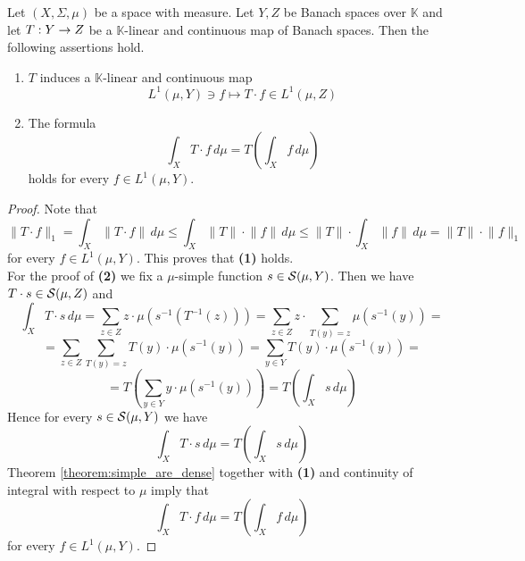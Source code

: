 \begin{proposition}\label{proposition:Bochner_integral_commutes_with_any_continuous_linear_operation}
    Let $(X,\Sigma,\mu)$ be a space with measure. Let $Y, Z$ be Banach spaces over $\mathbb{K}$ and let $T:Y \rightarrow Z$ be a $\mathbb{K}$-linear and continuous map of Banach spaces. Then the following assertions hold.
    \begin{enumerate}[label=\emph{\textbf{(\arabic*)}}, leftmargin=*]
        \item $T$ induces a $\mathbb{K}$-linear and continuous map 
        $$L^1(\mu,Y) \ni f \mapsto T \cdot f \in L^1(\mu,Z)$$
        \item The formula 
        $$\int_X T\cdot f \,d\mu = T\left(\int_X f\,d\mu\right)$$
        holds for every $f \in L^1(\mu,Y)$.
    \end{enumerate}
\end{proposition}
\begin{proof}
    Note that
    $$\lVert T\cdot f \rVert_1 = \int_X\lVert T\cdot f \rVert\,d\mu \leq \int_X \lVert T\rVert\cdot \lVert f \rVert\,d\mu \leq \lVert T\rVert\cdot \int_X  \lVert f \rVert\,d\mu = \lVert T\rVert\cdot \lVert f \rVert_1$$
    for every $f \in L^1(\mu,Y)$. This proves that \textbf{(1)} holds.\\
    For the proof of \textbf{(2)} we fix a $\mu$-simple function $s \in {\mathcal S}(\mu,Y)$. Then we have $T\cdot s \in {\mathcal S}(\mu,Z)$ and
    $$\int_X T\cdot s\,d\mu = \sum_{z \in Z}z \cdot \mu\left(s^{-1}\left(T^{-1}(z)\right)\right) = \sum_{z\in Z}z\cdot \sum_{T(y) = z}\mu\left(s^{-1}(y)\right) = $$
    $$= \sum_{z \in Z}\sum_{T(y) = z}T(y)\cdot \mu\left(s^{-1}(y)\right) = \sum_{y\in Y} T(y)\cdot \mu\left(s^{-1}(y)\right) = $$
    $$=T\left( \sum_{y\in Y} y\cdot \mu\left(s^{-1}(y)\right) \right) = T\left( \int_X s\,d\mu\right)$$
    Hence for every $s \in {\mathcal S}(\mu,Y)$ we have 
    $$\int_X T\cdot s \,d\mu = T\left(\int_X s\,d\mu\right)$$
    Theorem \ref{theorem:simple_are_dense} together with \textbf{(1)} and continuity of integral with respect to $\mu$ imply that
    $$\int_X T\cdot f \,d\mu = T\left(\int_X f\,d\mu\right)$$
    for every $f \in L^1(\mu,Y)$.
\end{proof}

